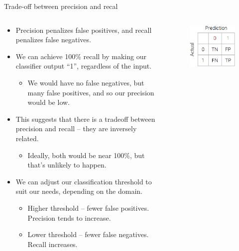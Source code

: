 \documentclass[aspectratio=169]{../latex_main/tntbeamer}  %
\begin{document}
	
	\begin{frame}{Trade-off between precision and recal}
	    \begin{columns}
	      \begin{column}{.8\textwidth}
	              \begin{itemize}
	                  \item Precision penalizes false positives, and recall penalizes false negatives.
	                  \item We can achieve 100\% recall by making our classifier output “1”, regardless of the input.
	                  \begin{itemize}
	                      \item We would have no false negatives, but many false positives, and so our precision would be low.
	                  \end{itemize}
	                  \item This suggests that there is a tradeoff between precision and recall – they are inversely related. 
	                  \begin{itemize}
	                      \item Ideally, both would be near 100\%, but that’s unlikely to happen.
	                  \end{itemize}
	                  \item We can adjust our classification threshold to suit our needs, depending on the domain.
	                  \begin{itemize}
	                      \item Higher threshold – fewer false positives. Precision tends to increase.
	                      \item Lower threshold – fewer false negatives. Recall increases.
	                  \end{itemize}
	              \end{itemize}
	      \end{column}
	      
	      
	      \begin{column}{.2\textwidth}
	             \begin{figure}
	                 \centering
	                 \includegraphics[scale=.4]{Bild12}
	             \end{figure} 
	      \end{column}
	  \end{columns}
	\end{frame}
	
\end{document}
